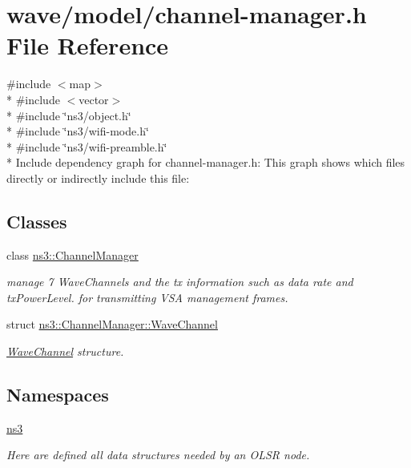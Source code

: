 \hypertarget{channel-manager_8h}{}\section{wave/model/channel-\/manager.h File Reference}
\label{channel-manager_8h}
{\ttfamily \#include $<$map$>$}\\*
{\ttfamily \#include $<$vector$>$}\\*
{\ttfamily \#include \char`\"{}ns3/object.\+h\char`\"{}}\\*
{\ttfamily \#include \char`\"{}ns3/wifi-\/mode.\+h\char`\"{}}\\*
{\ttfamily \#include \char`\"{}ns3/wifi-\/preamble.\+h\char`\"{}}\\*
Include dependency graph for channel-\/manager.h\+:
This graph shows which files directly or indirectly include this file\+:
\subsection*{Classes}
\begin{DoxyCompactItemize}
\item 
class \hyperlink{classns3_1_1ChannelManager}{ns3\+::\+Channel\+Manager}
\begin{DoxyCompactList}\small\item\em manage 7 Wave\+Channels and the tx information such as data rate and tx\+Power\+Level. for transmitting V\+SA management frames. \end{DoxyCompactList}\item 
struct \hyperlink{structns3_1_1ChannelManager_1_1WaveChannel}{ns3\+::\+Channel\+Manager\+::\+Wave\+Channel}
\begin{DoxyCompactList}\small\item\em \hyperlink{structns3_1_1ChannelManager_1_1WaveChannel}{Wave\+Channel} structure. \end{DoxyCompactList}\end{DoxyCompactItemize}
\subsection*{Namespaces}
\begin{DoxyCompactItemize}
\item 
 \hyperlink{namespacens3}{ns3}
\begin{DoxyCompactList}\small\item\em Here are defined all data structures needed by an O\+L\+SR node. \end{DoxyCompactList}\end{DoxyCompactItemize}
